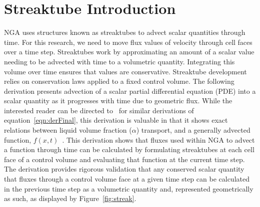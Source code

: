 \section{Streaktube Introduction}
NGA uses structures known as streaktubes to advect scalar quantities through time. For this research, we need to move flux values of velocity through cell faces over a time step. Streaktubes work by approximating an amount of a scalar value needing to be advected with time to a volumetric quantity. Integrating this volume over time ensures that values are conservative. Streaktube development relies on conservation laws applied to a fixed control volume. The following derivation presents advection of a scalar partial differential equation (PDE) into a scalar quantity as it progresses with time due to geometric flux. While the interested reader can be directed to~\cite{Owkes2017}  for similar derivations of equation~\ref{eqn:derFinal}, this derivation is valuable in that it shows exact relations between liquid volume fraction ($\alpha$) transport, and a generally advected function, $f(x,t)$~\cite{Owkes2017}. This derivation shows that fluxes used within NGA to advect a function through time can be calculated by formulating streaktubes at each cell face of a control volume and evaluating that function at the current time step. The derivation provides rigorous validation that any conserved scalar quantity that fluxes through a control volume face at a given time step can be calculated in the previous time step as a volumetric quantity and, represented geometrically as such, as displayed by Figure~\ref{fig:streak}.  
